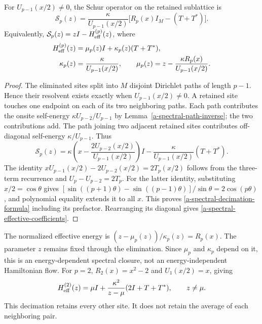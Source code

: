 \begin{theorem}
\label{a-spectral-chebyshev-schur}
For $U_{p-1}(x/2)\ne0$, the Schur operator on the retained sublattice is
\begin{equation}
 \mathcal S_p(z)=\frac{\kappa}{U_{p-1}(x/2)}
          \bigl[R_p(x)I_M-(T+T^*)\bigr].
 \label{a-spectral-decimation-formula}
\end{equation}
Equivalently, $\mathcal S_p(z)=zI-H_{\rm eff}^{(p)}(z)$, where
\begin{align}
 H_{\rm eff}^{(p)}(z)&=\mu_p(z)I+\kappa_p(z)(T+T^*),\nonumber\\
 \kappa_p(z)&=\frac{\kappa}{U_{p-1}(x/2)},\qquad
 \mu_p(z)=z-\frac{\kappa R_p(x)}{U_{p-1}(x/2)}.
 \label{a-spectral-effective-coefficients}
\end{align}
\end{theorem}
\begin{proof}
The eliminated sites split into $M$ disjoint Dirichlet paths of length
$p-1$. Hence their resolvent exists exactly when
$U_{p-1}(x/2)\ne0$. A retained site touches one endpoint on each of
its two neighboring paths. Each path contributes the onsite
self-energy $\kappa U_{p-2}/U_{p-1}$ by
Lemma~\ref{a-spectral-path-inverse}; the two contributions add.
The path joining two adjacent retained sites contributes off-diagonal
self-energy $\kappa/U_{p-1}$. Thus
\[
 \mathcal S_p(z)
 =\kappa\left(x-\frac{2U_{p-2}(x/2)}{U_{p-1}(x/2)}\right)I
       -\frac{\kappa}{U_{p-1}(x/2)}(T+T^*).
\]
The identity
$xU_{p-1}(x/2)-2U_{p-2}(x/2)=2T_p(x/2)$ follows from the
three-term recurrence and $U_p-U_{p-2}=2T_p$.
For the latter identity, substituting $x/2=\cos\theta$ gives
$[\sin((p+1)\theta)-\sin((p-1)\theta)]/\sin\theta
=2\cos(p\theta)$, and polynomial equality extends it to all $x$.
This proves \eqref{a-spectral-decimation-formula} including its
prefactor. Rearranging its diagonal gives
\eqref{a-spectral-effective-coefficients}.
\end{proof}

The normalized effective energy is
$(z-\mu_p(z))/\kappa_p(z)=R_p(x)$. The parameter $z$ remains fixed
through the elimination. Since $\mu_p$ and $\kappa_p$ depend on it,
this is an energy-dependent spectral closure, not an energy-independent
Hamiltonian flow. For $p=2$, $R_2(x)=x^2-2$ and $U_1(x/2)=x$, giving
\begin{equation}
 H_{\rm eff}^{(2)}(z)
 =\mu I+\frac{\kappa^2}{z-\mu}(2I+T+T^*),\qquad z\ne\mu.
 \label{a-spectral-dyadic-effective}
\end{equation}
This decimation retains every other site. It does not retain the
average of each neighboring pair.

